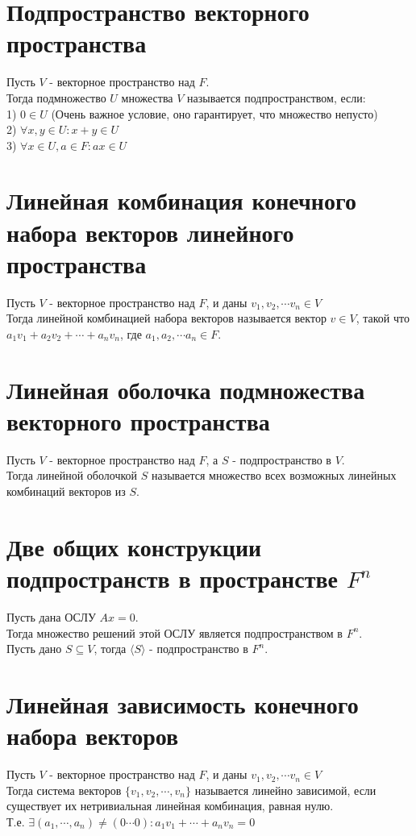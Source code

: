 \documentclass[a4paper,11pt]{report}
\begin{document}
\section{Подпространство векторного пространства}
Пусть $V$ - векторное пространство над $F$.\\
Тогда подмножество $U$ множества $V$ называется подпространством, если:\\
1) $0 \in U$ (Очень важное условие, оно гарантирует, что множество непусто)\\ 
2) $\forall x, y \in U: x + y \in U$\\
3) $\forall x \in U, a \in F: ax \in U$\\
\section{Линейная комбинация конечного набора векторов линейного пространства}
Пусть $V$ - векторное пространство над $F$, и даны $v_1, v_2, \cdots v_n \in V$\\
Тогда линейной комбинацией набора векторов называется вектор $v \in V$, такой что
$a_1v_1 + a_2v_2 + \cdots + a_nv_n$, где $a_1, a_2, \cdots a_n \in F$.
\section{Линейная оболочка подмножества векторного пространства}
Пусть $V$ - векторное пространство над $F$, а $S$ - подпространство в $V$.\\
Тогда линейной оболочкой $S$ называется множество всех возможных линейных комбинаций
векторов из $S$.
\section{Две общих конструкции подпространств в пространстве $F^n$}
Пусть дана ОСЛУ $Ax = 0$.\\
Тогда множество решений этой ОСЛУ является подпространством в $F^n$.\\
Пусть дано $S \subseteq V$, тогда $\langle S \rangle$ - подпространство в $F^n$.
\section{Линейная зависимость конечного набора векторов}
Пусть $V$ - векторное пространство над $F$, и даны $v_1, v_2, \cdots v_n \in V$\\
Тогда система векторов $\{ v_1, v_2, \cdots, v_n \}$ называется линейно зависимой,
если существует их нетривиальная линейная комбинация, равная нулю.\\
Т.е. $\exists (a_1, \cdots, a_n) \neq (0 \cdots 0): a_1v_1 + \cdots + a_nv_n = 0$\\
\end{document}
